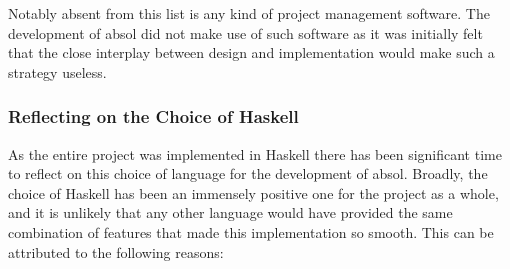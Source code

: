 Notably absent from this list is any kind of project management software.
The development of \gls{absol} did not make use of such software as it was initially felt that the close interplay between design and implementation would make such a strategy useless.

\subsubsection{Reflecting on the Choice of Haskell} %
\label{ssub:reflecting_on_the_choice_of_haskell}

As the entire project was implemented in Haskell there has been significant time to reflect on this choice of language for the development of \gls{absol}.
Broadly, the choice of Haskell has been an immensely positive one for the project as a whole, and it is unlikely that any other language would have provided the same combination of features that made this implementation so smooth.
This can be attributed to the following reasons:
